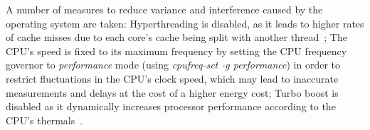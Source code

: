 A number of measures to reduce variance and
interference caused by the operating system are taken: Hyperthreading is
disabled, as it leads to higher rates of cache misses due to each core's cache
being split with another thread~\citep{fog2020optimizing}; The CPU's speed is
fixed to its maximum frequency by setting the CPU frequency governor to
\emph{performance} mode (using \emph{cpufreq-set -g performance}) in order to
restrict fluctuations in the CPU's clock speed, which may lead to inaccurate
measurements and delays at the cost of a higher energy cost; Turbo boost is disabled as it dynamically increases
processor performance according to the CPU's thermals~\citep[Section~14.3.3]{intel2021system}.
